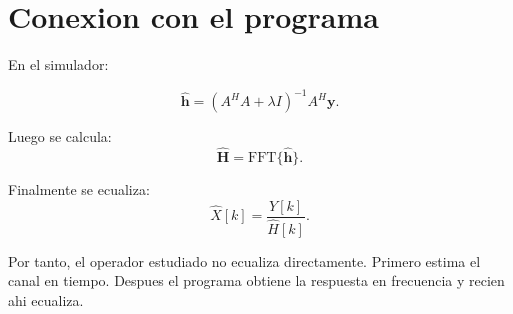 \documentclass[11pt]{article}
\begin{document}
\section{Conexion con el programa}

En el simulador:

\[
    \hat{\bm h}
    =
    (A^H A + \lambda I)^{-1}A^H\bm y.
\]

Luego se calcula:
\[
    \hat{\bm H} = \mathrm{FFT}\{\hat{\bm h}\}.
\]

Finalmente se ecualiza:
\[
    \hat{X}[k] = \frac{Y[k]}{\hat{H}[k]}.
\]

Por tanto, el operador estudiado no ecualiza directamente. Primero estima el
canal en tiempo. Despues el programa obtiene la respuesta en frecuencia y recien
ahi ecualiza.
\end{document}
